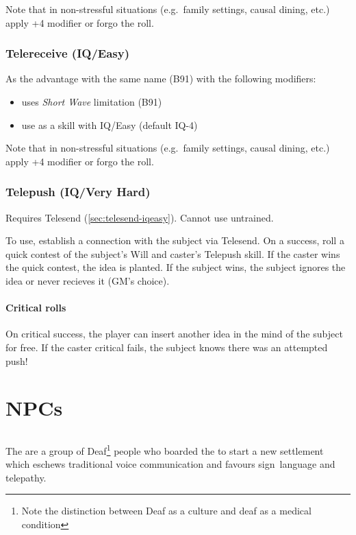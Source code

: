 \documentclass[a4paper,twocolumn]{memoir}
\begin{document}
Note that in non-stressful situations (e.g.~family settings, causal dining,
etc.) apply +4 modifier or forgo the roll.

\subsection{Telereceive (IQ/Easy)}
\label{sec:telereceive-iqeasy}

As the advantage with the same name (B91) with the following modifiers:
\begin{itemize}
\item uses \emph{Short Wave} limitation (B91)
\item use as a skill with IQ/Easy (default IQ-4)
\end{itemize}

Note that in non-stressful situations (e.g.~family settings, causal dining,
etc.) apply +4 modifier or forgo the roll.

\subsection{Telepush (IQ/Very Hard)}
\label{sec:telepush-iqveryhard}

Requires Telesend (\autoref{sec:telesend-iqeasy}). Cannot use untrained.

To use, establish a connection with the subject via Telesend. On a success, roll
a quick contest of the subject's Will and caster's Telepush skill. If the caster
wins the quick contest, the idea is planted. If the subject wins, the subject
ignores the idea or never recieves it (GM's choice).

\subsubsection{Critical rolls}
On critical success, the player can insert another idea in the mind of the
subject for free. If the caster critical fails, the subject knows there was an
attempted push!

\chapter{NPCs}

\section{\deafies}
\label{sec:teledeafs}

The \deafies are a group of Deaf\footnote{Note the distinction between Deaf as a
  culture and deaf as a medical condition} people who boarded the \aventis to
start a new settlement which eschews traditional voice communication and favours
sign~language and telepathy.
\end{document}
